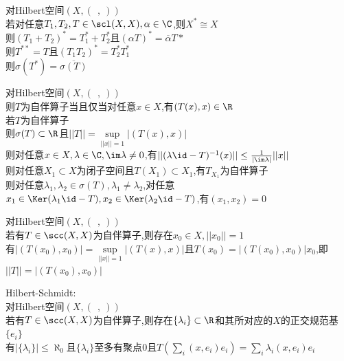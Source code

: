 \begin{dingli}
对Hilbert空间$(X,(\ \ ,\ ))$\\
若对任意$T_1,T_2,T\in\scl(X,X),\alpha\in\C$,则$X^{*}\cong X$\\
则$(T_1+T_2)^{*}=T_1^{*}+T_2^{*}$且$(\alpha T)^{*}=\overline{\alpha}T{*}$\\
则$T^{**}=T$且$(T_1T_2)^{*}=T_2^{*}T_1^{*}$\\
则$\sigma(T^{*})=\overline{\sigma(T)}$
\end{dingli}

\begin{dingli}
对Hilbert空间$(X,(\ \ ,\ ))$\\
则$T$为自伴算子当且仅当对任意$x\in X$,有$(T(x),x)\in\R$\\
若$T$为自伴算子\\
则$\sigma(T)\subset\R$且$||T||=\sup\limits_{||x||=1}|(T(x),x)|$\\
则对任意$x\in X,\lambda\in\C,\im\lambda\neq0$,有$||(\lambda\id-T)^{-1}(x)||\leq\frac{1}{|\im\lambda|}||x||$\\
则对任意$X_1\subset X$为闭子空间且$T(X_1)\subset X_1$,有$T_{X_1}$为自伴算子\\
则对任意$\lambda_1,\lambda_2\in\sigma(T),\lambda_1\neq\lambda_2$,对任意$x_1\in\Ker(\lambda_1\id-T),x_2\in\Ker(\lambda_2\id-T)$,有$(x_1,x_2)=0$
\end{dingli}

\begin{dingli}
对Hilbert空间$(X,(\ \ ,\ ))$\\
若有$T\in\scc(X,X)$为自伴算子,则存在$x_0\in X,||x_0||=1$\\
有$|(T(x_0),x_0)|=\sup\limits_{||x||=1}|(T(x),x)|$且$T(x_0)=|(T(x_0),x_0)|x_0$,即$||T||=|(T(x_0),x_0)|$
\end{dingli}

\begin{dingli}
Hilbert-Schmidt:\\
对Hilbert空间$(X,(\ \ ,\ ))$\\
若有$T\in\scc(X,X)$为自伴算子,则存在$\{\lambda_i\}\subset\R$和其所对应的$X$的正交规范基$\{e_i\}$\\
有$|\{\lambda_i\}|\leq\aleph_0$且$\{\lambda_i\}$至多有聚点$0$且$T(\sum\limits_{i}(x,e_i)e_i)=\sum\limits_{i}\lambda_i(x,e_i)e_i$
\end{dingli}

%